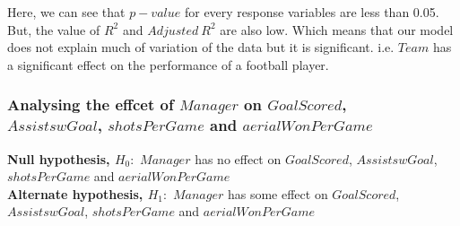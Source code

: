 \documentclass[12pt]{article}
\begin{document}
Here, we can see that $ p-value $ for every response variables are less than 0.05. But, the value of $ R^2 $ and $ Adjusted ~ R^2 $ are also low. Which means that our model does not explain much of variation of the data but it is significant. i.e. $ Team $ has a significant effect on the performance of a football player.

\newpage	

\subsubsection{Analysing the effcet of $ Manager $ on $ GoalScored $, \\ $ AssistswGoal $, $ shotsPerGame $  and $ aerialWonPerGame $}

\textbf{Null hypothesis, $ H_0: $} $ Manager $ has no effect on $ GoalScored $, $ AssistswGoal $, $ shotsPerGame $ and $ aerialWonPerGame $\\
\textbf{Alternate hypothesis, $ H_1: $} $ Manager $ has some effect on $ GoalScored $, $ AssistswGoal $, $ shotsPerGame $ and $ aerialWonPerGame $
	
\end{document}
